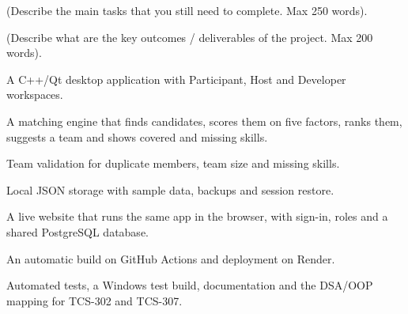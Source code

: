   {(Describe the main tasks that you still need to complete. Max 250 words).}

\newpage
\TFpagetop
{}
  {(Describe what are the key outcomes / deliverables of the project. Max 200 words).}
\TFgap{6.1bp}
\begin{answerbox}
\begin{tfbullets}
\item A C++/Qt desktop application with Participant, Host and Developer workspaces.
\item A matching engine that finds candidates, scores them on five factors, ranks them, suggests a team
      and shows covered and missing skills.
\item Team validation for duplicate members, team size and missing skills.
\item Local JSON storage with sample data, backups and session restore.
\item A live website that runs the same app in the browser, with sign-in, roles and a shared PostgreSQL
      database.
\item An automatic build on GitHub Actions and deployment on Render.
\item Automated tests, a Windows test build, documentation and the DSA/OOP mapping for TCS-302 and
      TCS-307.
\end{tfbullets}
\end{answerbox}

